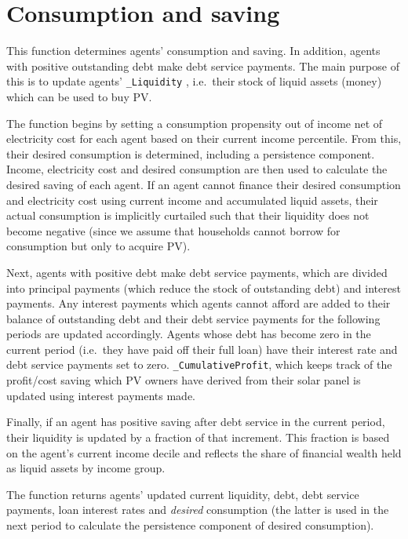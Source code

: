 \documentclass[
  letterpaper,
  DIV=11,
  numbers=noendperiod]{scrartcl}
\begin{document}
\hypertarget{consumption-and-saving}{%
\section{Consumption and saving}\label{consumption-and-saving}}

This function determines agents' consumption and saving. In addition,
agents with positive outstanding debt make debt service payments. The
main purpose of this is to update agents' \texttt{\_Liquidity} ,
i.e.~their stock of liquid assets (money) which can be used to buy PV.

The function begins by setting a consumption propensity out of income
net of electricity cost for each agent based on their current income
percentile. From this, their desired consumption is determined,
including a persistence component. Income, electricity cost and desired
consumption are then used to calculate the desired saving of each agent.
If an agent cannot finance their desired consumption and electricity
cost using current income and accumulated liquid assets, their actual
consumption is implicitly curtailed such that their liquidity does not
become negative (since we assume that households cannot borrow for
consumption but only to acquire PV).

Next, agents with positive debt make debt service payments, which are
divided into principal payments (which reduce the stock of outstanding
debt) and interest payments. Any interest payments which agents cannot
afford are added to their balance of outstanding debt and their debt
service payments for the following periods are updated accordingly.
Agents whose debt has become zero in the current period (i.e.~they have
paid off their full loan) have their interest rate and debt service
payments set to zero. \texttt{\_CumulativeProfit}, which keeps track of
the profit/cost saving which PV owners have derived from their solar
panel is updated using interest payments made.

Finally, if an agent has positive saving after debt service in the
current period, their liquidity is updated by a fraction of that
increment. This fraction is based on the agent's current income decile
and reflects the share of financial wealth held as liquid assets by
income group.

The function returns agents' updated current liquidity, debt, debt
service payments, loan interest rates and \emph{desired} consumption
(the latter is used in the next period to calculate the persistence
component of desired consumption).
\end{document}

